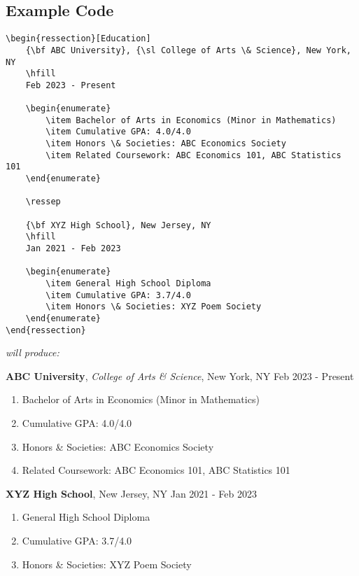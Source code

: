 \documentclass[a4paper,10pt]{article}
\begin{document}
\subsection{Example Code}
\begin{lstlisting}
\begin{ressection}[Education]
    {\bf ABC University}, {\sl College of Arts \& Science}, New York, NY
    \hfill
    Feb 2023 - Present

    \begin{enumerate}
        \item Bachelor of Arts in Economics (Minor in Mathematics)
        \item Cumulative GPA: 4.0/4.0
        \item Honors \& Societies: ABC Economics Society
        \item Related Coursework: ABC Economics 101, ABC Statistics 101
    \end{enumerate}
    
    \ressep

    {\bf XYZ High School}, New Jersey, NY
    \hfill
    Jan 2021 - Feb 2023
    
    \begin{enumerate}
        \item General High School Diploma
        \item Cumulative GPA: 3.7/4.0
        \item Honors \& Societies: XYZ Poem Society
    \end{enumerate}
\end{ressection}
\end{lstlisting}

\vspace{1cm}

{\it will produce:}

\vspace{1cm}
\begin{ressection}[Education]
    {\bf ABC University}, {\sl College of Arts \& Science}, New York, NY
    \hfill
    Feb 2023 - Present

    \begin{enumerate}
        \item Bachelor of Arts in Economics (Minor in Mathematics)
        \item Cumulative GPA: 4.0/4.0
        \item Honors \& Societies: ABC Economics Society
        \item Related Coursework: ABC Economics 101, ABC Statistics 101
    \end{enumerate}
    
    \ressep

    {\bf XYZ High School}, New Jersey, NY
    \hfill
    Jan 2021 - Feb 2023
    
    \begin{enumerate}
        \item General High School Diploma
        \item Cumulative GPA: 3.7/4.0
        \item Honors \& Societies: XYZ Poem Society
    \end{enumerate}
\end{ressection}
\end{document}
